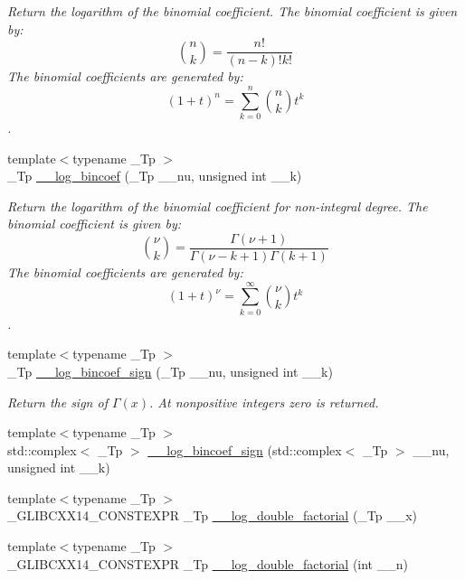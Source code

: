 \begin{DoxyCompactItemize}
\begin{DoxyCompactList}\small\item\em Return the logarithm of the binomial coefficient. The binomial coefficient is given by\+: \[ \binom{n}{k} = \frac{n!}{(n-k)! k!} \] The binomial coefficients are generated by\+: \[ \left(1 + t\right)^n = \sum_{k=0}^n \binom{n}{k} t^k \]. \end{DoxyCompactList}\item 
{\footnotesize template$<$typename \+\_\+\+Tp $>$ }\\\+\_\+\+Tp \hyperlink{namespacestd_1_1____detail_abd174c4887c0f3bbb5125e2a65856386}{\+\_\+\+\_\+log\+\_\+bincoef} (\+\_\+\+Tp \+\_\+\+\_\+nu, unsigned int \+\_\+\+\_\+k)
\begin{DoxyCompactList}\small\item\em Return the logarithm of the binomial coefficient for non-\/integral degree. The binomial coefficient is given by\+: \[ \binom{\nu}{k} = \frac{\Gamma(\nu+1)}{\Gamma(\nu-k+1) \Gamma(k+1)} \] The binomial coefficients are generated by\+: \[ \left(1 + t\right)^\nu = \sum_{k=0}^\infty \binom{\nu}{k} t^k \]. \end{DoxyCompactList}\item 
{\footnotesize template$<$typename \+\_\+\+Tp $>$ }\\\+\_\+\+Tp \hyperlink{namespacestd_1_1____detail_a6cea85f06264c3c9b05a76012205a0ca}{\+\_\+\+\_\+log\+\_\+bincoef\+\_\+sign} (\+\_\+\+Tp \+\_\+\+\_\+nu, unsigned int \+\_\+\+\_\+k)
\begin{DoxyCompactList}\small\item\em Return the sign of $ \Gamma(x) $. At nonpositive integers zero is returned. \end{DoxyCompactList}\item 
{\footnotesize template$<$typename \+\_\+\+Tp $>$ }\\std\+::complex$<$ \+\_\+\+Tp $>$ \hyperlink{namespacestd_1_1____detail_acaa1cf71cfd1d1ec4e897a9b9d10e8a1}{\+\_\+\+\_\+log\+\_\+bincoef\+\_\+sign} (std\+::complex$<$ \+\_\+\+Tp $>$ \+\_\+\+\_\+nu, unsigned int \+\_\+\+\_\+k)
\item 
{\footnotesize template$<$typename \+\_\+\+Tp $>$ }\\\+\_\+\+G\+L\+I\+B\+C\+X\+X14\+\_\+\+C\+O\+N\+S\+T\+E\+X\+PR \+\_\+\+Tp \hyperlink{namespacestd_1_1____detail_a0de46e790512550b535bdda97e11e1b5}{\+\_\+\+\_\+log\+\_\+double\+\_\+factorial} (\+\_\+\+Tp \+\_\+\+\_\+x)
\item 
{\footnotesize template$<$typename \+\_\+\+Tp $>$ }\\\+\_\+\+G\+L\+I\+B\+C\+X\+X14\+\_\+\+C\+O\+N\+S\+T\+E\+X\+PR \+\_\+\+Tp \hyperlink{namespacestd_1_1____detail_aa832ed1d29fd41c40cf892cc1feef7e9}{\+\_\+\+\_\+log\+\_\+double\+\_\+factorial} (int \+\_\+\+\_\+n)

\end{DoxyCompactItemize}
